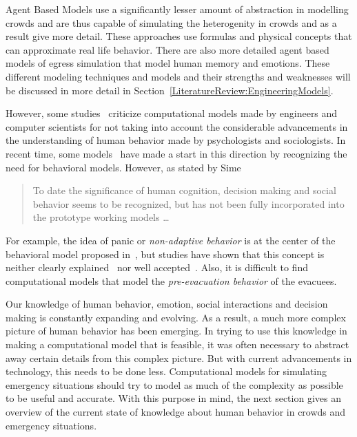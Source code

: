 Agent Based Models use a significantly lesser amount of abstraction in modelling crowds and are thus capable of simulating the heterogenity in crowds and as a result give more detail. These approaches use formulas and physical concepts that can approximate real life behavior. There are also more detailed agent based models of egress simulation that model human memory and emotions. These different modeling techniques and models and their strengths and weaknesses will be discussed in more detail in Section~\ref{LiteratureReview:EngineeringModels}.

However, some studies~\cite{Torres:2010tj,Sime:1995uu,Aguirre:2004tn} criticize computational models made by engineers and computer scientists for not taking into account the considerable advancements in the understanding of human behavior made by psychologists and sociologists. In recent time, some models~\cite{Pan:2006vp} have made a start in this direction by recognizing the need for behavioral models. However, as stated by Sime~\cite{Sime:1995uu}
\begin{quote}
To date the significance of human cognition, decision making and social behavior seems to be recognized, but has not been fully incorporated into the prototype working models \ldots
\end{quote}
For example, the idea of panic or \emph{non-adaptive behavior} is at the center of the behavioral model proposed in~\cite{Pan:2006vp}, but studies have shown that this concept is neither clearly explained~\cite{Torres:2010tj} nor well accepted~\cite{Cocking:2005uc,Paulsen:1984ti,Proulx:2001we,Ramachandran:1990wj,Sandberg:1997tw,Sime:1995uu}. Also, it is difficult to find computational models that model the \emph{pre-evacuation behavior} of the evacuees.

Our knowledge of human behavior, emotion, social interactions and decision making is constantly expanding and evolving. As a result, a much more complex picture of human behavior has been emerging. In trying to use this knowledge in making a computational model that is feasible, it was often necessary to abstract away certain details from this complex picture. But with current advancements in technology, this needs to be done less. Computational models for simulating emergency situations should try to model as much of the complexity as possible to be useful and accurate. With this purpose in mind, the next section gives an overview of the current state of knowledge about human behavior in crowds and emergency situations.

